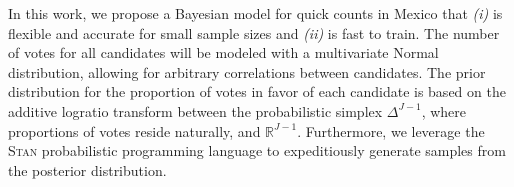 \documentclass[11pt]{article}
\begin{document}
In this work, we propose a Bayesian model for quick counts in Mexico that \textit{(i)} is flexible and accurate for small sample sizes and \textit{(ii)} is fast to train. The number of votes for all candidates will be modeled with a multivariate Normal distribution, allowing for arbitrary correlations between candidates. The prior distribution for the proportion of votes in favor of each candidate is based on the additive logratio transform between the probabilistic simplex $\Delta^{J-1}$, where proportions of votes reside naturally, and $\mathbb{R}^{J-1}$. Furthermore, we leverage the \textsc{Stan} probabilistic programming language \citep{rstan} to expeditiously generate samples from the posterior distribution.


\clearpage
\small
\printbibliography
\end{document}
